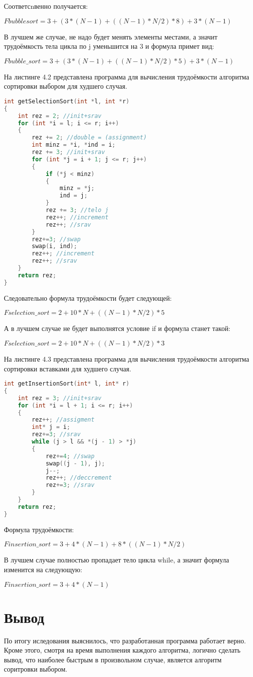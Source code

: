 Соответсnвенно получается:

$Fbubblesort = 3 + (3*(N-1) + ((N-1)*N/2)*8) + 3*(N-1)$

В лучшем же случае, не надо будет менять элементы местами, а значит трудоёмкость тела цикла по j уменьшится на 3 и формула примет вид:

$Fbubble\_sort = 3 + (3*(N-1) + ((N-1)*N/2)*5) + 3*(N-1)$

\newpage
На листинге 4.2 представлена программа для вычисления трудоёмкости алгоритма сортировки выбором для худшего случая.

\begin{lstlisting}[language=c++, caption=Вычисление трудоёмкости алгоритма сортировки выбором]
int getSelectionSort(int *l, int *r)
{
	int rez = 2; //init+srav
	for (int *i = l; i <= r; i++)
	{
		rez += 2; //double = (assignment)
		int minz = *i, *ind = i;
		rez += 3; //init+srav
		for (int *j = i + 1; j <= r; j++)
		{
			if (*j < minz)
			{
				minz = *j;
				ind = j;
			}
			rez += 3; //telo j
			rez++; //increment
			rez++; //srav
		}
		rez+=3; //swap
		swap(i, ind);
		rez++; //increment
		rez++; //srav
	}
	return rez;
}
\end{lstlisting}

Следовательно формула трудоёмкости будет следующей:

$Fselection\_sort = 2 + 10*N + ((N-1)*N/2)*5$

А в лучшем случае не будет выполнятся условие if и формула станет такой:

$Fselection\_sort = 2 + 10*N + ((N-1)*N/2)*3$

\newpage
На листинге 4.3 представлена программа для вычисления трудоёмкости алгоритма сортировки вставками для худшего случая.

\begin{lstlisting}[language=c++, caption=Вычисление трудоёмкости алгоритма сортировки вставками]
int getInsertionSort(int* l, int* r)
{
	int rez = 3; //init+srav
	for (int *i = l + 1; i <= r; i++)
	{
		rez++; //assigment
		int* j = i;
		rez+=3; //srav
		while (j > l && *(j - 1) > *j)
		{
			rez+=4; //swap
			swap((j - 1), j);
			j--;
			rez++; //deccrement
			rez+=3; //srav
		}
	}
	return rez;
}
\end{lstlisting}

Формула трудоёмкости:

$Finsertion\_sort = 3 + 4*(N-1) + 8*((N-1)*N/2)$

В лучшем случае полностью пропадает тело цикла while, а значит формула изменится на следующую:

$Finsertion\_sort = 3 + 4*(N-1)$

\section{Вывод}
По итогу иследования выяснилось, что разработанная программа работает верно. Кроме этого, смотря на время выполнения каждого алгоритма, логично сделать вывод, что наиболее быстрым в произвольном случае, является алгоритм соритровки выбором.